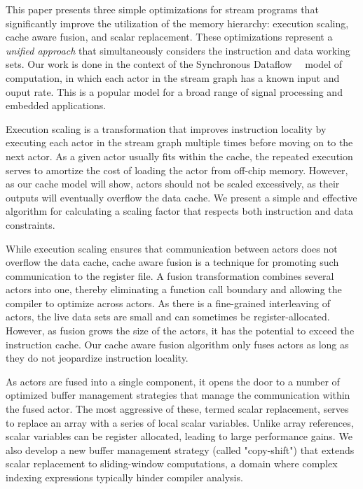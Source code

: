 This paper presents three simple optimizations for stream programs
that significantly improve the utilization of the memory hierarchy:
execution scaling, cache aware fusion, and scalar replacement.  These
optimizations represent a {\it unified approach} that simultaneously
considers the instruction and data working sets.  Our work is done in
the context of the Synchronous Dataflow~~\cite{LM87-i} model of
computation, in which each actor in the stream graph has a known input
and ouput rate.  This is a popular model for a broad range of signal
processing and embedded applications.

Execution scaling is a transformation that improves instruction
locality by executing each actor in the stream graph multiple times
before moving on to the next actor.  As a given actor usually fits
within the cache, the repeated execution serves to amortize the cost
of loading the actor from off-chip memory.  However, as our cache
model will show, actors should not be scaled excessively, as their
outputs will eventually overflow the data cache.  We present a simple
and effective algorithm for calculating a scaling factor that respects
both instruction and data constraints.

While execution scaling ensures that communication between actors does
not overflow the data cache, cache aware fusion is a technique for
promoting such communication to the register file.  A fusion
transformation combines several actors into one, thereby eliminating a
function call boundary and allowing the compiler to optimize across
actors.  As there is a fine-grained interleaving of actors, the live
data sets are small and can sometimes be register-allocated.  However,
as fusion grows the size of the actors, it has the potential to exceed
the instruction cache.  Our cache aware fusion algorithm only fuses
actors as long as they do not jeopardize instruction locality.

As actors are fused into a single component, it opens the door to a
number of optimized buffer management strategies that manage the
communication within the fused actor.  The most aggressive of these,
termed scalar replacement, serves to replace an array with a series of
local scalar variables.  Unlike array references, scalar variables can
be register allocated, leading to large performance gains.  We also
develop a new buffer management strategy (called "copy-shift") that
extends scalar replacement to sliding-window computations, a domain
where complex indexing expressions typically hinder compiler analysis.

